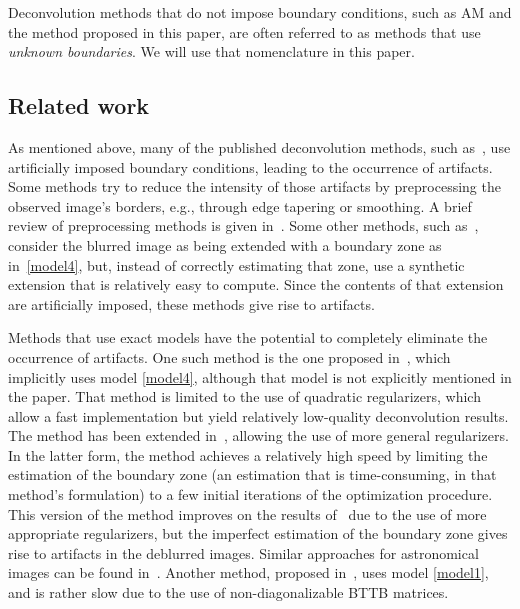 \documentclass[10pt,twocolumn,twoside]{IEEEtran}
\begin{document}
Deconvolution methods that do not impose boundary conditions, such as AM and the method proposed in this paper, are often referred to as methods that use \emph{unknown boundaries}. We will use that nomenclature in this paper.


\subsection{Related work}

As mentioned above, many of the published deconvolution methods, such as~\cite{Ng1999, Hansen2006, Donatelli2010, Danielyan2012}, use artificially imposed boundary conditions, leading to the occurrence of artifacts. Some methods try to reduce the intensity of those artifacts by preprocessing the observed image's borders, e.g., through edge tapering or smoothing. A brief review of preprocessing methods is given in~\cite{Reeves2005}. Some other methods, such as~\cite{Jia2008, Fan2011}, consider the blurred image as being extended with a boundary zone as in~\eqref{model4}, but, instead of correctly estimating that zone, use a synthetic extension that is relatively easy to compute. Since the contents of that extension are artificially imposed, these methods give rise to artifacts.

Methods that use exact models have the potential to completely eliminate the occurrence of artifacts. One such method is the one proposed in~\cite{Reeves2005}, which implicitly uses model \eqref{model4}, although that model is not explicitly mentioned in the paper. That method is limited to the use of quadratic regularizers, which allow a fast implementation but yield relatively low-quality deconvolution results. The method has been extended in~\cite{Sorel2012}, allowing the use of more general regularizers. In the latter form, the method achieves a relatively high speed by limiting the estimation of the boundary zone (an estimation that is time-consuming, in that method's formulation) to a few initial iterations of the optimization procedure. This version of the method improves on the results of~\cite{Reeves2005} due to the use of more appropriate regularizers, but the imperfect estimation of the boundary zone gives rise to artifacts in the deblurred images. Similar approaches for astronomical images can be found in~\cite{Bertero2005, Vio2005}. Another method, proposed in~\cite{Chan2004}, uses model \eqref{model1}, and is rather slow due to the use of non-diagonalizable BTTB matrices.
\end{document}
